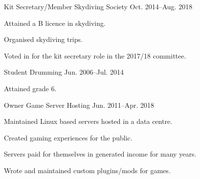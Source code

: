 

\begin{cventries}

  \cventry
    {Kit Secretary/Member} %
    {Skydiving Society} %
    {} %
    {Oct. 2014--Aug. 2018} %
    {
      \begin{cvmitems} %
        \item {Attained a B licence in skydiving.}
        \item {Organised skydiving trips.}
        \item {Voted in for the kit secretary role in the 2017/18 committee.}
      \end{cvmitems}
    }

  \cventry
    {Student} %
    {Drumming} %
    {} %
    {Jun. 2006--Jul. 2014} %
    {
      \begin{cvitems} %
        \item {Attained grade 6.}
      \end{cvitems}
    }

  \cventry
    {Owner} %
    {Game Server Hosting} %
    {} %
    {Jun. 2011--Apr. 2018} %
    {
      \begin{cvmitems} %
        \item {Maintained Linux based servers hosted in a data centre.}
        \item {Created gaming experiences for the public.}
        \item {Servers paid for themselves in generated income for many years.}
        \item {Wrote and maintained custom plugins/mods for games.}
      \end{cvmitems}
    }

\end{cventries}
